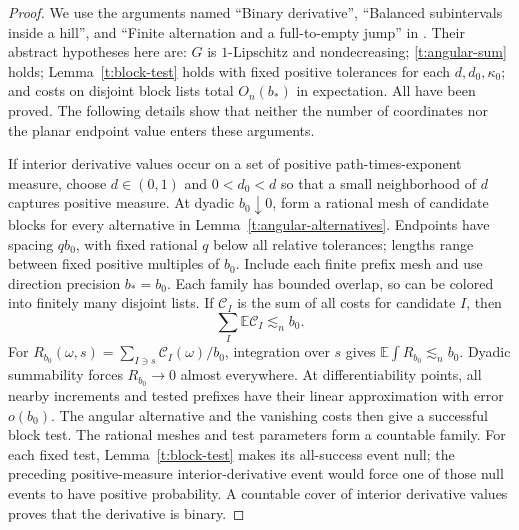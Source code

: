 \begin{proof}
We use the arguments named ``Binary derivative'', ``Balanced subintervals
inside a hill'', and ``Finite alternation and a full-to-empty jump'' in
\citet[Section~3]{PSE2026}.  Their abstract hypotheses here are:
$G$ is $1$-Lipschitz and nondecreasing; \eqref{t:angular-sum} holds;
Lemma~\ref{t:block-test} holds with fixed positive tolerances for each
$d,d_0,\kappa_0$; and costs on disjoint block lists total $O_n(b_*)$ in
expectation.  All have been proved.  The following details show that
neither the number of coordinates nor the planar endpoint value enters
these arguments.

If interior derivative values occur on a set of positive
path-times-exponent measure, choose $d\in(0,1)$ and $0<d_0<d$ so
that a small neighborhood of $d$ captures positive measure.  At dyadic
$b_0\downarrow0$, form a rational mesh of candidate blocks for every
alternative in Lemma~\ref{t:angular-alternatives}.  Endpoints have spacing
$qb_0$, with fixed rational $q$ below all relative tolerances; lengths
range between fixed positive multiples of $b_0$.  Include each finite
prefix mesh and use direction precision $b_*=b_0$.  Each family has
bounded overlap, so can be colored into finitely many disjoint lists.
If $\mathcal C_I$ is the sum of all costs for candidate $I$, then
\begin{equation}\label{t:mesh-cost}
 \sum_I\mathbb E\mathcal C_I\lesssim_n b_0.
\end{equation}
For $R_{b_0}(\omega,s)=\sum_{I\ni s}\mathcal C_I(\omega)/b_0$,
integration over $s$ gives $\mathbb E\int R_{b_0}\lesssim_n b_0$.
Dyadic summability forces $R_{b_0}\to0$ almost everywhere.
At differentiability points, all nearby increments and tested prefixes
have their linear approximation with error $o(b_0)$.  The angular
alternative and the vanishing costs then give a successful block test.
The rational meshes and test parameters form a countable family.  For
each fixed test, Lemma~\ref{t:block-test} makes its all-success event
null; the preceding positive-measure interior-derivative event would
force one of those null events to have positive probability.  A countable cover
of interior derivative values proves that the derivative is binary.


\end{proof}
